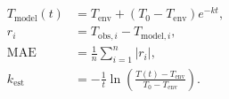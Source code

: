 \documentclass[border=6pt]{standalone}
\begin{document}
\begin{minipage}{12cm}
\begin{align*}
T_{\mathrm{model}}(t)&=T_{\mathrm{env}}+(T_0-T_{\mathrm{env}})e^{-kt},\\
r_i&=T_{\mathrm{obs},i}-T_{\mathrm{model},i},\\
\mathrm{MAE}&=\frac{1}{n}\sum_{i=1}^{n}|r_i|,\\
k_{\mathrm{est}}&=-\frac{1}{t}\ln\!\left(\frac{T(t)-T_{\mathrm{env}}}{T_0-T_{\mathrm{env}}}\right).
\end{align*}
\end{minipage}
\end{document}
